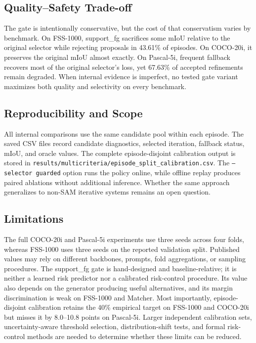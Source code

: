 \documentclass{CVM}
\begin{document}
\subsection{Quality--Safety Trade-off}

The gate is intentionally conservative, but the cost of that conservatism varies by benchmark. On FSS-1000, support\_fg sacrifices some mIoU relative to the original selector while rejecting proposals in 43.61\% of episodes. On COCO-20i, it preserves the original mIoU almost exactly. On Pascal-5i, frequent fallback recovers most of the original selector's loss, yet 67.63\% of accepted refinements remain degraded. When internal evidence is imperfect, no tested gate variant maximizes both quality and selectivity on every benchmark.

\subsection{Reproducibility and Scope}

All internal comparisons use the same candidate pool within each episode. The saved CSV files record candidate diagnostics, selected iteration, fallback status, mIoU, and oracle values. The complete episode-disjoint calibration output is stored in \texttt{results/multicriteria/episode\_split\_calibration.csv}. The \texttt{--selector guarded} option runs the policy online, while offline replay produces paired ablations without additional inference. Whether the same approach generalizes to non-SAM iterative systems remains an open question.

\subsection{Limitations}

The full COCO-20i and Pascal-5i experiments use three seeds across four folds, whereas FSS-1000 uses three seeds on the reported validation split. Published values may rely on different backbones, prompts, fold aggregations, or sampling procedures. The support\_fg gate is hand-designed and baseline-relative; it is neither a learned risk predictor nor a calibrated risk-control procedure. Its value also depends on the generator producing useful alternatives, and its margin discrimination is weak on FSS-1000 and Matcher. Most importantly, episode-disjoint calibration retains the 40\% empirical target on FSS-1000 and COCO-20i but misses it by 8.0--10.8 points on Pascal-5i. Larger independent calibration sets, uncertainty-aware threshold selection, distribution-shift tests, and formal risk-control methods are needed to determine whether these limits can be reduced.
\end{document}
